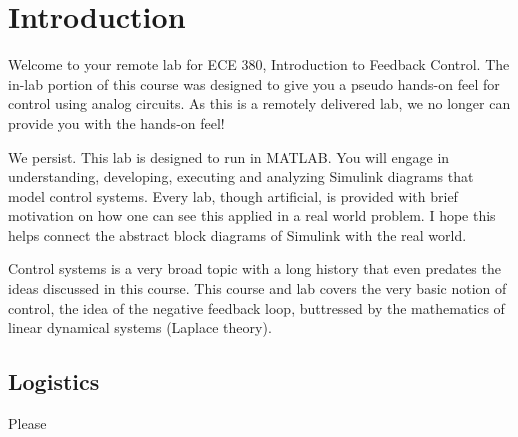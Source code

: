 \documentclass[letterpaper, 12pt, oneside]{memoir}
\begin{document}
\frontmatter

\tableofcontents*
\thispagestyle{empty}


%
\chapter{Introduction}
Welcome to your remote lab for ECE 380, Introduction to Feedback Control.
The in-lab portion of this course was designed to give you a pseudo hands-on
feel for control using analog circuits. As this is a remotely delivered lab,
we no longer can provide you with the hands-on feel!

We persist. This lab is designed to run in MATLAB. You will engage
in understanding, developing, executing and analyzing Simulink
diagrams that model control systems. Every lab, though artificial, is
provided with brief motivation on how one can see this applied in a real
world problem. I hope this helps connect the abstract block diagrams of
Simulink with the real world.

Control systems is a very broad topic with a long history that even predates
the ideas discussed in this course. This course and lab covers the very basic
notion of control, the idea of the negative feedback loop, buttressed by
the mathematics of linear dynamical systems (Laplace theory).

\section{Logistics}
Please
\end{document}
